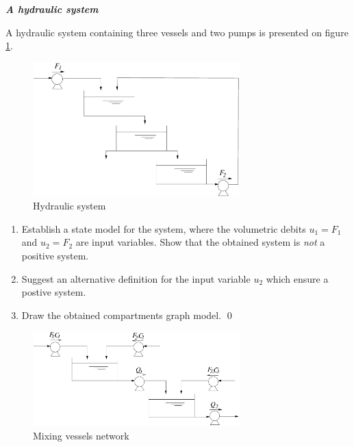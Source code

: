 \begin{exercice}{\bf \em A hydraulic system}

A hydraulic system containing three vessels and two pumps is presented on figure \ref{Fig:systhydr}.
\begin{figure}[h]
\begin{center}
\includegraphics[width=8cm]{systhydr}
\caption{Hydraulic system}
\label{Fig:systhydr}
\end{center} 
\end{figure}
\begin{enumerate}
\item Establish a state model for the system, where the volumetric debits $u_1 = F_1$ and $u_2 = F_2$ are input variables. 
Show that the obtained system is {\it not} a positive system. 
\item Suggest an alternative definition for the input variable $u_2$ which ensure a postive system. 
\item Draw the obtained compartments graph model. \qed
\end{enumerate}
\end{exercice}
\vv 

\begin{figure}[!ht] 
\begin{center}
\includegraphics[width=8cm]{cuvmel}
\caption{Mixing vessels network}
\label{Fig:cuvmel}
\end{center} 
\end{figure}

